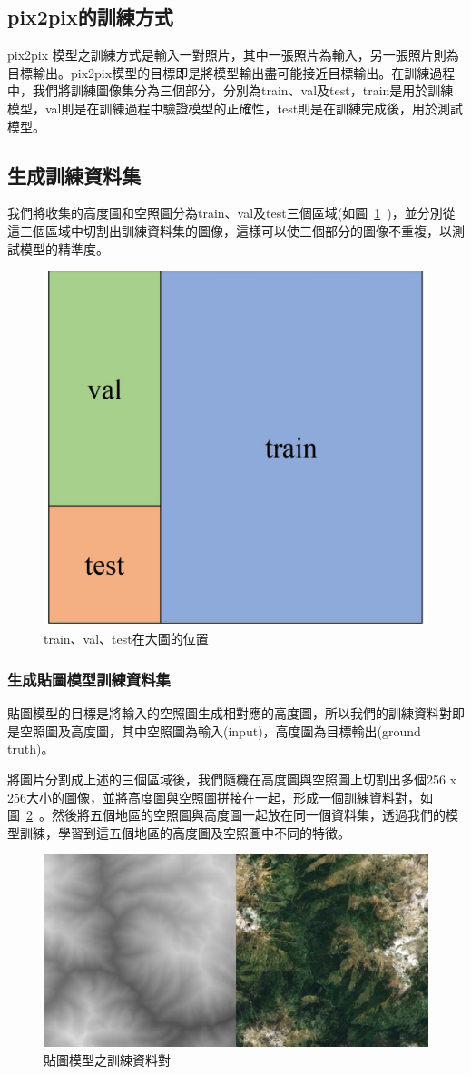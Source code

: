 \documentclass[a4paper, 12pt]{article}
\begin{document}
\subsection{pix2pix的訓練方式}
pix2pix 模型之訓練方式是輸入一對照片，其中一張照片為輸入，另一張照片則為目標輸出。pix2pix模型的目標即是將模型輸出盡可能接近目標輸出。在訓練過程中，我們將訓練圖像集分為三個部分，分別為train、val及test，train是用於訓練模型，val則是在訓練過程中驗證模型的正確性，test則是在訓練完成後，用於測試模型。
\subsection{生成訓練資料集}
我們將收集的高度圖和空照圖分為train、val及test三個區域(如圖~\ref{fig:8}~)，並分別從這三個區域中切割出訓練資料集的圖像，這樣可以使三個部分的圖像不重複，以測試模型的精準度。

\begin{figure}[htbp]
    \centering
    \includegraphics[width=0.3\linewidth]{fig/8.jpg}
    \caption{train、val、test在大圖的位置}
    \label{fig:8}
\end{figure}

\subsubsection{生成貼圖模型訓練資料集}
貼圖模型的目標是將輸入的空照圖生成相對應的高度圖，所以我們的訓練資料對即是空照圖及高度圖，其中空照圖為輸入(input)，高度圖為目標輸出(ground truth)。

將圖片分割成上述的三個區域後，我們隨機在高度圖與空照圖上切割出多個256 x 256大小的圖像，並將高度圖與空照圖拼接在一起，形成一個訓練資料對，如圖~\ref{fig:9}~。然後將五個地區的空照圖與高度圖一起放在同一個資料集，透過我們的模型訓練，學習到這五個地區的高度圖及空照圖中不同的特徵。

\begin{figure}[htbp]
    \centering
    \includegraphics[width=0.5\linewidth]{fig/9.jpg}
    \caption{貼圖模型之訓練資料對}
    \label{fig:9}
\end{figure}
\end{document}
